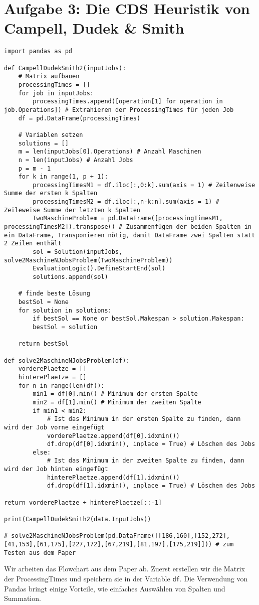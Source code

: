 \documentclass{article}
\begin{document}
	\section*{Aufgabe 3: Die CDS Heuristik von Campell, Dudek \& Smith}
	\begin{lstlisting}
import pandas as pd

def CampellDudekSmith2(inputJobs):
	# Matrix aufbauen
	processingTimes = []
	for job in inputJobs:
		processingTimes.append([operation[1] for operation in job.Operations]) # Extrahieren der ProcessingTimes für jeden Job
	df = pd.DataFrame(processingTimes)

	# Variablen setzen
	solutions = []
	m = len(inputJobs[0].Operations) # Anzahl Maschinen
	n = len(inputJobs) # Anzahl Jobs
	p = m - 1
	for k in range(1, p + 1):
		processingTimesM1 = df.iloc[:,0:k].sum(axis = 1) # Zeilenweise Summe der ersten k Spalten
		processingTimesM2 = df.iloc[:,n-k:n].sum(axis = 1) # Zeileweise Summe der letzten k Spalten
		TwoMaschineProblem = pd.DataFrame([processingTimesM1, processingTimesM2]).transpose() # Zusammenfügen der beiden Spalten in ein DataFrame, Transponieren nötig, damit DataFrame zwei Spalten statt 2 Zeilen enthält
		sol = Solution(inputJobs, solve2MaschineNJobsProblem(TwoMaschineProblem))
		EvaluationLogic().DefineStartEnd(sol)
		solutions.append(sol)

	# finde beste Lösung
	bestSol = None
	for solution in solutions:
		if bestSol == None or bestSol.Makespan > solution.Makespan:
		bestSol = solution

	return bestSol

def solve2MaschineNJobsProblem(df):
	vorderePlaetze = []
	hinterePlaetze = []
	for n in range(len(df)):
		min1 = df[0].min() # Minimum der ersten Spalte
		min2 = df[1].min() # Minimum der zweiten Spalte
		if min1 < min2:
			# Ist das Minimum in der ersten Spalte zu finden, dann wird der Job vorne eingefügt
			vorderePlaetze.append(df[0].idxmin())
			df.drop(df[0].idxmin(), inplace = True) # Löschen des Jobs
		else:
			# Ist das Minimum in der zweiten Spalte zu finden, dann wird der Job hinten eingefügt
			hinterePlaetze.append(df[1].idxmin())
			df.drop(df[1].idxmin(), inplace = True) # Löschen des Jobs

return vorderePlaetze + hinterePlaetze[::-1]

print(CampellDudekSmith2(data.InputJobs))

# solve2MaschineNJobsProblem(pd.DataFrame([[186,160],[152,272],[41,153],[61,175],[227,172],[67,219],[81,197],[175,219]])) # zum Testen aus dem Paper

	\end{lstlisting}
	Wir arbeiten das Flowchart aus dem Paper ab. Zuerst erstellen wir die Matrix der ProcessingTimes und speichern sie in der Variable \texttt{df}. Die Verwendung von Pandas bringt einige Vorteile, wie einfaches Auswählen von Spalten und Summation.
	
\end{document}
